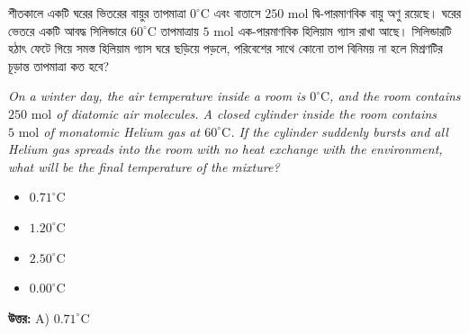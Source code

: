 \documentclass[12pt, a4paper]{article}
\begin{document}
\begin{tcolorbox}[questionbox={প্রশ্ন (Question) 22}]
    \noindent
    শীতকালে একটি ঘরের ভিতরের বায়ুর তাপমাত্রা $0^\circ\text{C}$ এবং বাতাসে $250\text{ mol}$ দ্বি-পারমাণবিক বায়ু অণু রয়েছে। ঘরের ভেতরে একটি আবদ্ধ সিলিন্ডারে $60^\circ\text{C}$ তাপমাত্রায় $5\text{ mol}$ এক-পারমাণবিক হিলিয়াম গ্যাস রাখা আছে। সিলিন্ডারটি হঠাৎ ফেটে গিয়ে সমস্ত হিলিয়াম গ্যাস ঘরে ছড়িয়ে পড়লে, পরিবেশের সাথে কোনো তাপ বিনিময় না হলে মিশ্রণটির চূড়ান্ত তাপমাত্রা কত হবে?
    
    \vspace{0.8em}
    \begin{english}
    \noindent\textit{\color{darkgray}
    On a winter day, the air temperature inside a room is $0^\circ\text{C}$, and the room contains $250\text{ mol}$ of diatomic air molecules. A closed cylinder inside the room contains $5\text{ mol}$ of monatomic Helium gas at $60^\circ\text{C}$. If the cylinder suddenly bursts and all Helium gas spreads into the room with no heat exchange with the environment, what will be the final temperature of the mixture?
    }
    \end{english}
\end{tcolorbox}

\begin{itemize}[label={}, leftmargin=1cm, itemsep=0.5em]
    \item[\textbf{A)}] $0.71^\circ\text{C}$
    \item[\textbf{B)}] $1.20^\circ\text{C}$
    \item[\textbf{C)}] $2.50^\circ\text{C}$
    \item[\textbf{D)}] $0.00^\circ\text{C}$
\end{itemize}

\vspace{0.5em}
\begin{tcolorbox}[answerbox]
    \textbf{\color{success} উত্তর:} A) $0.71^\circ\text{C}$
\end{tcolorbox}
\vspace{1em}
\end{document}
